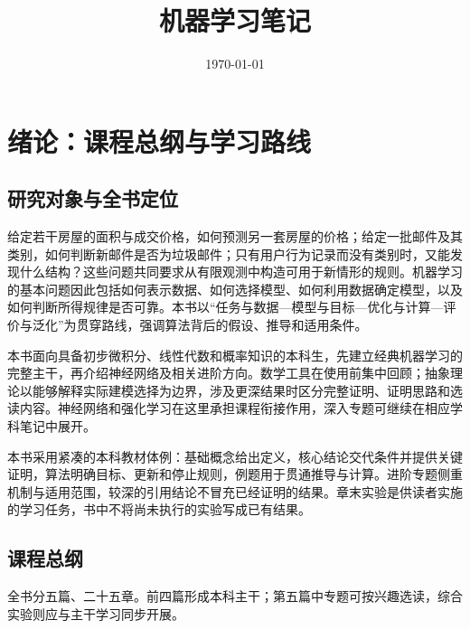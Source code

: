 \documentclass[UTF8,12pt,a4paper,fontset=fandol]{ctexbook}
\title{机器学习笔记}
\author{}
\date{\today}
\begin{document}
\maketitle
\tableofcontents
\clearpage


\chapter*{绪论：课程总纲与学习路线}

\section*{研究对象与全书定位}

给定若干房屋的面积与成交价格，如何预测另一套房屋的价格；给定一批邮件及其类别，如何判断新邮件是否为垃圾邮件；只有用户行为记录而没有类别时，又能发现什么结构？这些问题共同要求从有限观测中构造可用于新情形的规则。机器学习的基本问题因此包括如何表示数据、如何选择模型、如何利用数据确定模型，以及如何判断所得规律是否可靠。本书以“任务与数据---模型与目标---优化与计算---评价与泛化”为贯穿路线，强调算法背后的假设、推导和适用条件。

本书面向具备初步微积分、线性代数和概率知识的本科生，先建立经典机器学习的完整主干，再介绍神经网络及相关进阶方向。数学工具在使用前集中回顾；抽象理论以能够解释实际建模选择为边界，涉及更深结果时区分完整证明、证明思路和选读内容。神经网络和强化学习在这里承担课程衔接作用，深入专题可继续在相应学科笔记中展开。

本书采用紧凑的本科教材体例：基础概念给出定义，核心结论交代条件并提供关键证明，算法明确目标、更新和停止规则，例题用于贯通推导与计算。进阶专题侧重机制与适用范围，较深的引用结论不冒充已经证明的结果。章末实验是供读者实施的学习任务，书中不将尚未执行的实验写成已有结果。

\section*{课程总纲}

全书分五篇、二十五章。前四篇形成本科主干；第五篇中专题可按兴趣选读，综合实验则应与主干学习同步开展。
\end{document}
